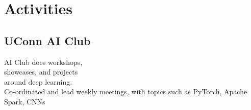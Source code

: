 \documentclass[]{resume-template}
\begin{document}
\begin{minipage}[t]{0.33\textwidth}

  \section{Activities}\label{sec:activities}

  \subsection{UConn AI Club}\label{subsec:uconn-ai-club}
  \textbullet{} AI Club does workshops,\\showcases, and projects \\around deep learning.\\
  \textbullet{} Co-ordinated and lead weekly meetings, with topics such as PyTorch, Apache Spark, CNNs\\

  \vspace{\topsep}




\end{minipage}
\end{document}
